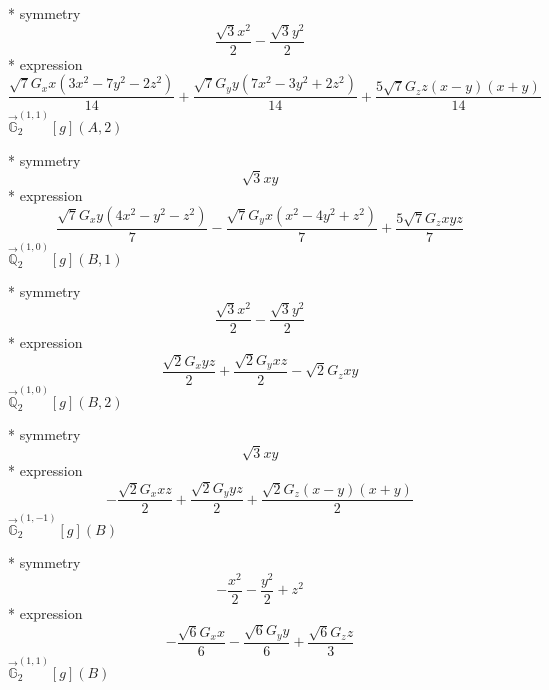 \documentclass[fleqn,8pt]{jsarticle}
\begin{document}
\noindent\quad ** symmetry
\begin{dmath*}
\frac{\sqrt{3} x^{2}}{2} - \frac{\sqrt{3} y^{2}}{2}
\end{dmath*}
\noindent\quad ** expression
\begin{dmath*}
\frac{\sqrt{7} G_{x} x \left(3 x^{2} - 7 y^{2} - 2 z^{2}\right)}{14} + \frac{\sqrt{7} G_{y} y \left(7 x^{2} - 3 y^{2} + 2 z^{2}\right)}{14} + \frac{5 \sqrt{7} G_{z} z \left(x - y\right) \left(x + y\right)}{14}
\end{dmath*}
\noindent\quad $\vec{\mathbb{G}}_{2}^{(1,1)}[g](A,2)$

\noindent\quad ** symmetry
\begin{dmath*}
\sqrt{3} x y
\end{dmath*}
\noindent\quad ** expression
\begin{dmath*}
\frac{\sqrt{7} G_{x} y \left(4 x^{2} - y^{2} - z^{2}\right)}{7} - \frac{\sqrt{7} G_{y} x \left(x^{2} - 4 y^{2} + z^{2}\right)}{7} + \frac{5 \sqrt{7} G_{z} x y z}{7}
\end{dmath*}
\noindent\quad $\vec{\mathbb{Q}}_{2}^{(1,0)}[g](B,1)$

\noindent\quad ** symmetry
\begin{dmath*}
\frac{\sqrt{3} x^{2}}{2} - \frac{\sqrt{3} y^{2}}{2}
\end{dmath*}
\noindent\quad ** expression
\begin{dmath*}
\frac{\sqrt{2} G_{x} y z}{2} + \frac{\sqrt{2} G_{y} x z}{2} - \sqrt{2} G_{z} x y
\end{dmath*}
\noindent\quad $\vec{\mathbb{Q}}_{2}^{(1,0)}[g](B,2)$

\noindent\quad ** symmetry
\begin{dmath*}
\sqrt{3} x y
\end{dmath*}
\noindent\quad ** expression
\begin{dmath*}
- \frac{\sqrt{2} G_{x} x z}{2} + \frac{\sqrt{2} G_{y} y z}{2} + \frac{\sqrt{2} G_{z} \left(x - y\right) \left(x + y\right)}{2}
\end{dmath*}
\noindent\quad $\vec{\mathbb{G}}_{2}^{(1,-1)}[g](B)$

\noindent\quad ** symmetry
\begin{dmath*}
- \frac{x^{2}}{2} - \frac{y^{2}}{2} + z^{2}
\end{dmath*}
\noindent\quad ** expression
\begin{dmath*}
- \frac{\sqrt{6} G_{x} x}{6} - \frac{\sqrt{6} G_{y} y}{6} + \frac{\sqrt{6} G_{z} z}{3}
\end{dmath*}
\noindent\quad $\vec{\mathbb{G}}_{2}^{(1,1)}[g](B)$
\end{document}
